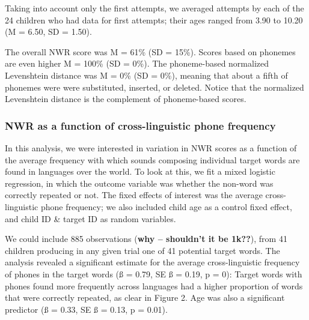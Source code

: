 \documentclass[english,,man,floatsintext]{apa6}
\begin{document}
Taking into account only the first attempts, we averaged attempts by
each of the 24 children who had data for first attempts; their ages
ranged from 3.90 to 10.20 (M = 6.50, SD = 1.50).

The overall NWR score was M = 61\% (SD = 15\%). Scores based on phonemes
are even higher M = 100\% (SD = 0\%). The phoneme-based normalized
Levenshtein distance was M = 0\% (SD = 0\%), meaning that about a fifth
of phonemes were were substituted, inserted, or deleted. Notice that the
normalized Levenshtein distance is the complement of phoneme-based
scores.

\subsubsection{NWR as a function of cross-linguistic phone
frequency}\label{nwr-as-a-function-of-cross-linguistic-phone-frequency}

In this analysis, we were interested in variation in NWR scores as a
function of the average frequency with which sounds composing individual
target words are found in languages over the world. To look at this, we
fit a mixed logistic regression, in which the outcome variable was
whether the non-word was correctly repeated or not. The fixed effects of
interest was the average cross-linguistic phone frequency; we also
included child age as a control fixed effect, and child ID \& target ID
as random variables.

We could include 885 observations (\textbf{why -- shouldn't it be
1k??}), from 41 children producing in any given trial one of 41
potential target words. The analysis revealed a significant estimate for
the average cross-linguistic frequency of phones in the target words (ß
= 0.79, SE ß = 0.19, p = 0): Target words with phones found more
frequently across languages had a higher proportion of words that were
correctly repeated, as clear in Figure 2. Age was also a significant
predictor (ß = 0.33, SE ß = 0.13, p = 0.01).
\end{document}
